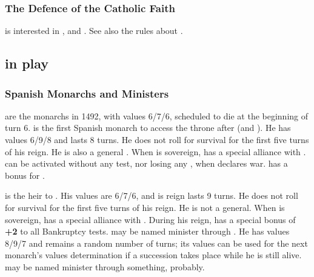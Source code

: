 \subsubsection{The Defence of the Catholic Faith}
 \SPA is interested in ,  and .
\bparag See also the rules about .



\subsection{ in play}


\subsubsection{Spanish Monarchs and Ministers}
 are the monarchs in 1492,
with values 6/7/6, scheduled to die at the beginning of turn 6.
 is the first Spanish monarch to
access the throne after  (and ). He has values 6/9/8 and lasts 8 turns. He does not roll
for survival for the first five turns of his reign. He is also a general
.
\bparag When  is sovereign, \HAB has a special
alliance with \SPA. %
\HAB can be activated without any test, nor losing any \STAB, when \SPA
declares war.
\bparag \SPA has a bonus for .

 is the heir to . His values are 6/7/6, and is reign lasts 9 turns. He does not roll
for survival for the first five turns of his reign. He is not a general.
\bparag When  is sovereign, \HAB has a special
alliance with \SPA. %
\bparag During his reign, \HAB has a special bonus of {\bf +2} to all
Bankruptcy tests.
 may be named minister through
. He has values 8/9/7 and remains a random number
of turns; its values can be used for the next monarch's values
determination if a succession takes place while he is still alive.
 may be named minister through
something, probably.


